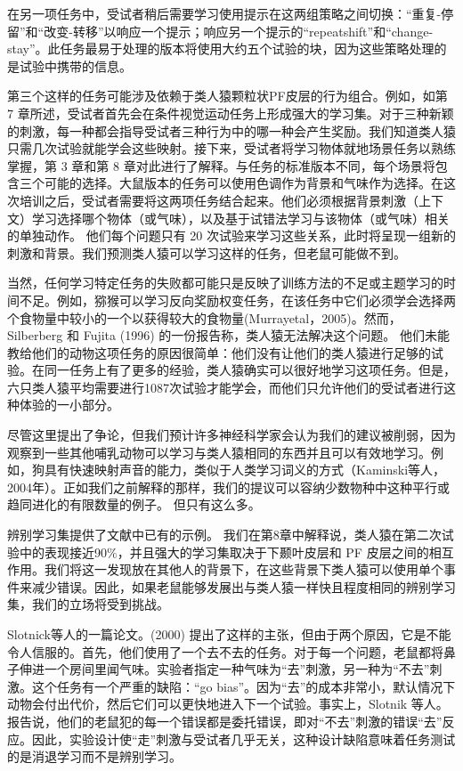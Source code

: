 \par 
在另一项任务中，受试者稍后需要学习使用提示在这两组策略之间切换：“重复-停留”和“改变-转移”以响应一个提示；响应另一个提示的“repeatshift”和“change-stay”。此任务最易于处理的版本将使用大约五个试验的块，因为这些策略处理的是试验中携带的信息。
\par 
第三个这样的任务可能涉及依赖于类人猿颗粒状PF皮层的行为组合。例如，如第 7 章所述，受试者首先会在条件视觉运动任务上形成强大的学习集。对于三种新颖的刺激，每一种都会指导受试者三种行为中的哪一种会产生奖励。我们知道类人猿只需几次试验就能学会这些映射。接下来，受试者将学习物体就地场景任务以熟练掌握，第 3 章和第 8 章对此进行了解释。与任务的标准版本不同，每个场景将包含三个可能的选择。大鼠版本的任务可以使用色调作为背景和气味作为选择。在这次培训之后，受试者需要将这两项任务结合起来。他们必须根据背景刺激（上下文）学习选择哪个物体（或气味），以及基于试错法学习与该物体（或气味）相关的单独动作。 他们每个问题只有 20 次试验来学习这些关系，此时将呈现一组新的刺激和背景。我们预测类人猿可以学习这样的任务，但老鼠可能做不到。
\par 
当然，任何学习特定任务的失败都可能只是反映了训练方法的不足或主题学习的时间不足。例如，猕猴可以学习反向奖励权变任务，在该任务中它们必须学会选择两个食物量中较小的一个以获得较大的食物量(Murrayetal，2005)。然而，Silberberg 和 Fujita (1996) 的一份报告称，类人猿无法解决这个问题。 他们未能教给他们的动物这项任务的原因很简单：他们没有让他们的类人猿进行足够的试验。在同一任务上有了更多的经验，类人猿确实可以很好地学习这项任务。但是，六只类人猿平均需要进行1087次试验才能学会，而他们只允许他们的受试者进行这种体验的一小部分。
\par 
尽管这里提出了争论，但我们预计许多神经科学家会认为我们的建议被削弱，因为观察到一些其他哺乳动物可以学习与类人猿相同的东西并且可以有效地学习。例如，狗具有快速映射声音的能力，类似于人类学习词义的方式（Kaminski等人，2004年）。正如我们之前解释的那样，我们的提议可以容纳少数物种中这种平行或趋同进化的有限数量的例子。 但只有这么多。
\par 
辨别学习集提供了文献中已有的示例。 我们在第8章中解释说，类人猿在第二次试验中的表现接近90$\%$，并且强大的学习集取决于下颞叶皮层和 PF 皮层之间的相互作用。我们将这一发现放在其他人的背景下，在这些背景下类人猿可以使用单个事件来减少错误。因此，如果老鼠能够发展出与类人猿一样快且程度相同的辨别学习集，我们的立场将受到挑战。
\par 
Slotnick等人的一篇论文。(2000) 提出了这样的主张，但由于两个原因，它是不能令人信服的。首先，他们使用了一个去不去的任务。对于每一个问题，老鼠都将鼻子伸进一个房间里闻气味。实验者指定一种气味为“去”刺激，另一种为“不去”刺激。这个任务有一个严重的缺陷：“go bias”。因为“去”的成本非常小，默认情况下动物会付出代价，然后它们可以更快地进入下一个试验。事实上，Slotnik 等人。报告说，他们的老鼠犯的每一个错误都是委托错误，即对“不去”刺激的错误“去”反应。因此，实验设计使“走”刺激与受试者几乎无关，这种设计缺陷意味着任务测试的是消退学习而不是辨别学习。
